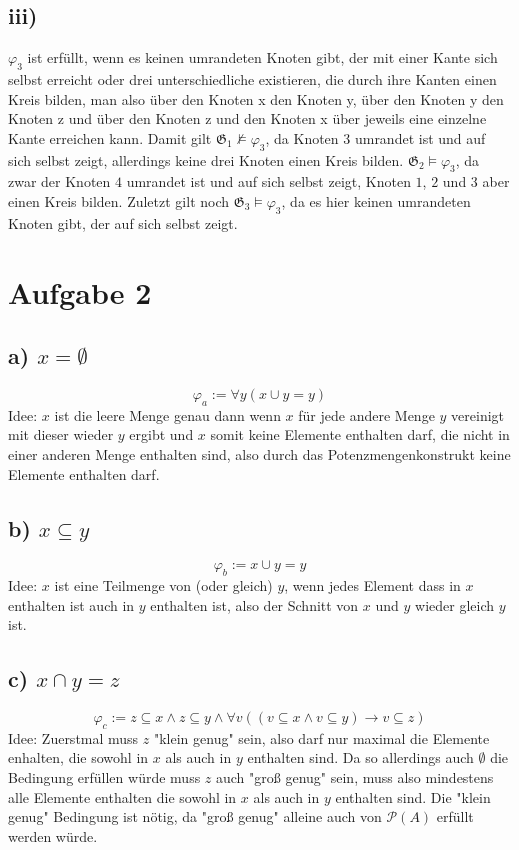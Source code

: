 \documentclass[11pt, a4paper]{article}
\newcommand{\n}{\wedge}
\begin{document}
\subsection*{iii)}
$\varphi_3$ ist erfüllt, wenn es keinen umrandeten Knoten gibt, der mit einer Kante sich selbst erreicht oder drei unterschiedliche existieren, die durch ihre Kanten einen Kreis bilden, man also über den Knoten x den Knoten y, über den Knoten y den Knoten z und über den Knoten z und den Knoten x über jeweils eine einzelne Kante erreichen kann.\newline
Damit gilt $\mathfrak{G}_1 \nvDash \varphi_3$, da Knoten 3 umrandet ist und auf sich selbst zeigt, allerdings keine drei Knoten einen Kreis bilden.\newline
$\mathfrak{G}_2 \vDash \varphi_3$, da zwar der Knoten $4$ umrandet ist und auf sich selbst zeigt, Knoten $1$, $2$ und $3$ aber einen Kreis bilden.\newline
Zuletzt gilt noch $\mathfrak{G}_3 \vDash \varphi_3$, da es hier keinen umrandeten Knoten gibt, der auf sich selbst zeigt.

\section*{Aufgabe 2}
\subsection*{a) $x = \emptyset$}
\[
    \varphi_a := \forall y ( x \cup y = y )
\]
Idee: $x$ ist die leere Menge genau dann wenn $x$ für jede andere Menge $y$ vereinigt mit dieser wieder $y$ ergibt und $x$ somit keine Elemente enthalten darf, die nicht in einer anderen Menge enthalten sind, also durch das Potenzmengenkonstrukt keine Elemente enthalten darf.

\subsection*{b) $x \subseteq y$}
\[
    \varphi_b := x \cup y = y
\]
Idee: $x$ ist eine Teilmenge von (oder gleich) $y$, wenn jedes Element dass in $x$ enthalten ist auch in $y$ enthalten ist, also der Schnitt von $x$ und $y$ wieder gleich $y$ ist.

\subsection*{c) $x \cap y = z$}
\[
    \varphi_c := z \subseteq x \n z \subseteq y \n \forall v ((v \subseteq x \n v \subseteq y) \rightarrow v \subseteq z)
\]
Idee:
Zuerstmal muss $z$ "klein genug" sein, also darf nur maximal die Elemente enhalten, die sowohl in $x$ als auch in $y$ enthalten sind.
Da so allerdings auch $\emptyset$ die Bedingung erfüllen würde muss $z$ auch "groß genug" sein, muss also mindestens alle Elemente enthalten die sowohl in $x$ als auch in $y$ enthalten sind.
Die "klein genug" Bedingung ist nötig, da "groß genug" alleine auch von $\mathcal{P}(A)$ erfüllt werden würde.
\end{document}
